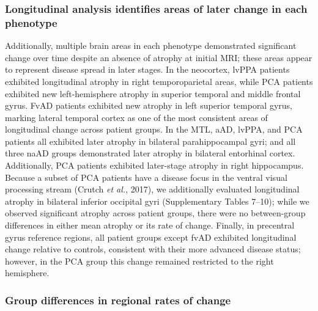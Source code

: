 \documentclass[]{article}
\begin{document}
\subsubsection*{Longitudinal analysis identifies areas of later change
in each
phenotype}\label{longitudinal-analysis-identifies-areas-of-later-change-in-each-phenotype}

Additionally, multiple brain areas in each phenotype demonstrated
significant change over time despite an absence of atrophy at initial
MRI; these areas appear to represent disease spread in later stages. In
the neocortex, lvPPA patients exhibited longitudinal atrophy in right
temporoparietal areas, while PCA patients exhibited new left-hemisphere
atrophy in superior temporal and middle frontal gyrus. FvAD patients
exhibited new atrophy in left superior temporal gyrus, marking lateral
temporal cortex as one of the most consistent areas of longitudinal
change across patient groups. In the MTL, aAD, lvPPA, and PCA patients
all exhibited later atrophy in bilateral parahippocampal gyri; and all
three naAD groups demonstrated later atrophy in bilateral entorhinal
cortex. Additionally, PCA patients exhibited later-stage atrophy in
right hippocampus. Because a subset of PCA patients have a disease focus
in the ventral visual processing stream (Crutch \emph{et al.}, 2017), we
additionally evaluated longitudinal atrophy in bilateral inferior
occipital gyri (Supplementary Tables 7--10); while we observed
significant atrophy across patient groups, there were no between-group
differences in either mean atrophy or its rate of change. Finally, in
precentral gyrus reference regions, all patient groups except fvAD
exhibited longitudinal change relative to controls, consistent with
their more advanced disease status; however, in the PCA group this
change remained restricted to the right hemisphere.

\subsubsection*{Group differences in regional rates of
change}\label{group-differences-in-regional-rates-of-change}
\end{document}

